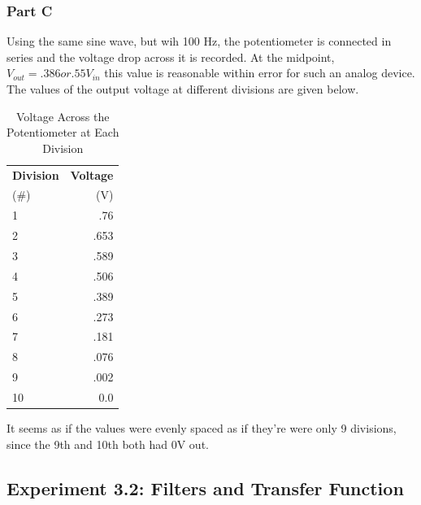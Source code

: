 \documentclass[10pt]{article}
\begin{document}
\subsubsection{Part C} 
	Using the same sine wave, but wih 100 Hz, the potentiometer is connected in series and the voltage drop across it is recorded. At the midpoint, $V_{out} = .386 or .55 V_{in}$ this value is reasonable within error for such an analog device. 
	The values of the output voltage at different divisions are given below.
\begin{table}[H]
	\begin{center}
		\caption{Voltage Across the Potentiometer at Each Division}
		\label{tab: 31C}
		\begin{tabular}{l|r}
			\textbf{Division} & \textbf{Voltage}\\
			(\#) & (V)\\
			\hline
			1 & .76\\
			2 & .653\\
			3 & .589\\
			4 & .506\\
			5 & .389\\
			6 & .273\\
			7 & .181\\
			8 & .076\\
			9 & .002\\
			10 & 0.0\\
		\end{tabular}
	\end{center}
\end{table}
 	It seems as if the values were evenly spaced as if they're were only 9 divisions, since the 9th and 10th both had 0V out.
\subsection{Experiment 3.2: Filters and Transfer Function}
\end{document}
